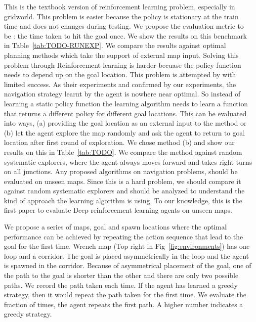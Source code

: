 \begin{description}
    This is the textbook version of reinforcement learning problem, especially in gridworld. This problem is easier because the policy
    is stationary at the train time and does not changes during
    testing.
    We propose the evaluation metric to be : the time taken to hit the goal once. We show the results on this benchmark in Table~\ref{tab:TODO-RUNEXP}.
    We compare the results against optimal planning methods which take the support of external map input.
    Solving this problem through Reinforcement learning is harder becuase the policy function needs to depend up on the goal location.
    This problem is attempted by \cite{MiPaViICLR2017} with limited success.
    As their experiments and confirmed by our experiments, the navigation strategy learnt by the agent is nowhere near optimal.
    So instead of learning a static policy function the learning algorithm needs to learn a function that returns a different policy for different goal locations.
    This can be evaluated into ways, (a) providing the goal location as an external input to the method or (b) let the agent explore the map randomly and ask the agent to return to goal location after first round of exploration.
    We chose method (b) and show our results on this in Table~\ref{tab:TODO}.
    We compare the method against random systematic explorers, where the agent always moves forward and takes right turns on all junctions.
    Any proposed algorithms on navigation problems, should be evaluated on unseen maps.
    Since this is a hard problem, we should compare it against random systematic explorers and should be analyzed to understand the kind of approach the learning algorithm is using.
    To our knowledge, this is the first paper to evaluate Deep reinforcement learning agents on unseen maps.
    \begin{description}
        We propose a series of maps, goal and spawn locations where the optimal performance can be achieved by repeating the action sequence that lead to the goal for the first time.
        Wrench map (Top right in Fig~\ref{fig:environments}) has one loop and a corridor.
        The goal is placed asymmetrically in the loop and the agent is spawned in the corridor.
        Because of asymmetrical placement of the goal, one of the path to the goal is shorter than the other and there are only two possible paths.
        We record the path taken each time. If the agent has learned a greedy strategy, then it would repeat the path taken for the first time.
        We evaluate the fraction of times, the agent repeats the first path. A higher number indicates a greedy strategy.


\end{description}
\end{description}
